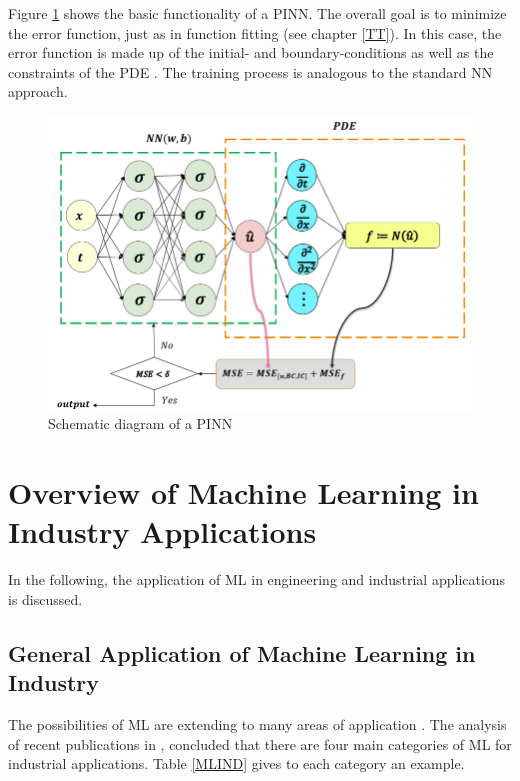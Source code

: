 Figure \ref{fig:piml} shows the basic functionality of a PINN. The overall goal is to minimize the error function, just as in function fitting (see chapter \ref{TT}). In this case, the error function is made up of the initial- and boundary-conditions as well as the constraints of the PDE \cite{Guo}. The training process is analogous to the standard NN approach. 
\begin{figure}[H]
	\centering
	\includegraphics[width=0.8\linewidth]{IMGs/piml.png}
	\caption{Schematic diagram of a PINN \cite{Guo}}
	\label{fig:piml}
\end{figure}





\section{Overview of Machine Learning in Industry Applications}
In the following, the application of ML in engineering and industrial applications is discussed.
\subsection{General Application of Machine Learning in Industry}
The possibilities of ML are extending to many areas of application \cite{Deiana}. The analysis of recent publications in \cite{Bertolini}, concluded that there are four main categories of ML for industrial applications. Table \ref{MLIND} gives to each category an example.

